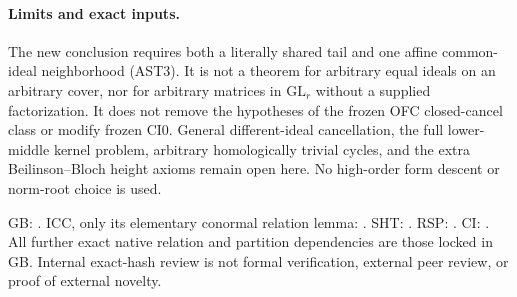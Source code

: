 \paragraph{Limits and exact inputs.}
The new conclusion requires both a literally shared tail and
one affine common-ideal neighborhood (AST3).  It is not a theorem
for arbitrary equal ideals on an arbitrary cover, nor for arbitrary
matrices in $\mathrm{GL}_r$ without a supplied factorization.
It does not remove the hypotheses of the frozen OFC closed-cancel
class or modify frozen CI0.  General different-ideal cancellation,
the full lower-middle kernel problem, arbitrary homologically
trivial cycles, and the extra Beilinson--Bloch height axioms remain
open here.  No high-order form descent or norm-root choice is used.

GB: .
ICC, only its elementary conormal relation lemma:
.
SHT: .
RSP: .
CI: .
All further exact native relation and partition dependencies are
those locked in GB.  Internal exact-hash review is not formal
verification, external peer review, or proof of external novelty.
